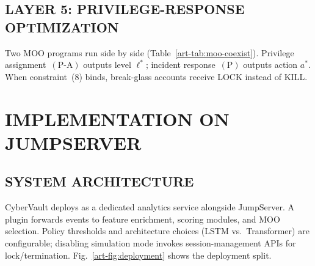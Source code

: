 \subsection{LAYER 5: PRIVILEGE-RESPONSE OPTIMIZATION}
Two MOO programs run side by side (Table~\ref{art-tab:moo-coexist}). Privilege assignment~$(\mathrm{P}\text{-}\mathrm{A})$ outputs level $\ell^*$; incident response~$(\mathrm{P})$ outputs action $a^*$. When constraint~(8) binds, break-glass accounts receive LOCK instead of KILL.

\section{IMPLEMENTATION ON JUMPSERVER}
\label{art-sec:implementation}

\subsection{SYSTEM ARCHITECTURE}
CyberVault deploys as a dedicated analytics service alongside JumpServer. A plugin forwards events to feature enrichment, scoring modules, and MOO selection. Policy thresholds and architecture choices (LSTM vs.\ Transformer) are configurable; disabling simulation mode invokes session-management APIs for lock/termination. Fig.~\ref{art-fig:deployment} shows the deployment split.

